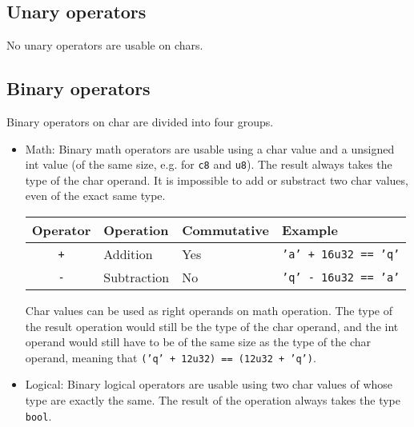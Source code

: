 \subsection{Unary operators}
\label{sec:org78546fb}

No unary operators are usable on chars.

\subsection{Binary operators}
\label{sec:orge863f7d}

Binary operators on char are divided into four groups.

\begin{itemize}
\item Math: Binary math operators are usable using a char value and a unsigned
  int value (of the same size, e.g. for \texttt{c8} and \texttt{u8}). The result
  always takes the type of the char operand. It is impossible to add or
  substract two char values, even of the exact same type.


  \begin{center}
    \vspace{-5pt}\begin{adjustbox}{max width=1.0\linewidth}
      \begin{tabular}{|c|lll|}
        \hline
        Operator & Operation & Commutative & Example\\[0pt]
        \hline
        \hline
        \texttt{+} & Addition & Yes & \texttt{'a' + 16u32 == 'q'}\\[0pt]
        \texttt{-} & Subtraction & No & \texttt{'q' - 16u32 == 'a'}\\[0pt]
        \hline
      \end{tabular}
  \end{adjustbox}\end{center}


  Char values can be used as right operands on math operation. The type of the
  result operation would still be the type of the char operand, and the int
  operand would still have to be of the same size as the type of the char
  operand, meaning that \texttt{('q' + 12u32) == (12u32 + 'q')}.

\item Logical: Binary logical operators are usable using two char values of
  whose type are exactly the same. The result of the operation always takes the
  type \texttt{bool}.



\end{itemize}
